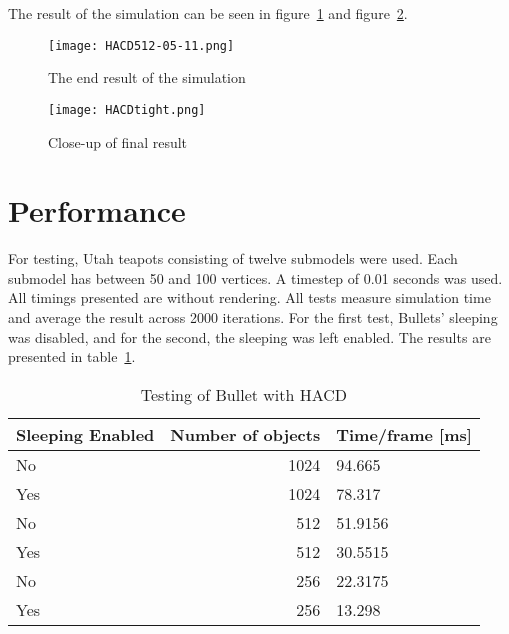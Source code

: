 The result of the simulation can be seen in figure~\ref{fig:hacd0.0} and figure~\ref{fig:tight}.
\begin{figure}[H]
  \centering
  \texttt{[image: HACD512-05-11.png]}
  \caption{The end result of the simulation}
  \label{fig:hacd0.0}
\end{figure}

\begin{figure}[H]
  \centering
  \texttt{[image: HACDtight.png]}
  \caption{Close-up of final result}
  \label{fig:tight}
\end{figure}

\section{Performance}
For testing, Utah teapots consisting of twelve submodels were used. Each submodel has
between 50 and 100 vertices. A timestep of 0.01 seconds was used. All timings
presented are without rendering. All tests measure simulation
time and average the result across 2000 iterations. For the first test, Bullets' sleeping was
disabled, and for the second, the sleeping was left enabled. The results are presented
in table~\ref{tab:hacdtest}.

\begin{table}[htbp]
\caption{Testing of Bullet with HACD}
\begin{center}
\begin{tabular}{|l|r|l|}
\hline
\textbf{Sleeping Enabled} & \multicolumn{1}{l|}{\textbf{Number of objects}} & \textbf{Time/frame [ms]} \\ \hline
No & 1024 & 94.665 \\ \hline
Yes  & 1024 & 78.317 \\ \hline
No & 512 & 51.9156 \\ \hline
Yes  & 512 & 30.5515 \\ \hline
No & 256 & 22.3175 \\ \hline
Yes  & 256 & 13.298 \\ \hline
\end{tabular}
\end{center}
\label{tab:hacdtest}
\end{table}


